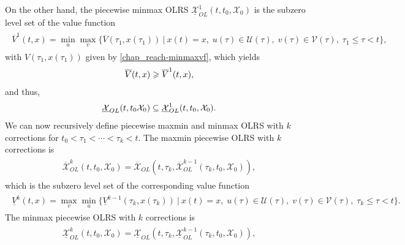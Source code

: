 \documentclass[letterpaper,10pt,english]{sphinxmanual}
\begin{document}
On the other hand, the piecewise minmax OLRS
\(\underline{{\mathcal X}}_{OL}^1(t, t_0, {\mathcal X}_0)\) is the
subzero level set of the value function
\label{chap_reach:equation-minmaxvf1}\begin{gather}
\begin{split}\overline{V}^1(t, x) =
\min_u\max_v\{\overline{V}(\tau_1, x(\tau_1)) ~|~ x(t)=x, \;
u(\tau)\in{\mathcal U}(\tau), \; v(\tau)\in{\mathcal V}(\tau), \; \tau_1\leqslant\tau<t\},\end{split}\label{chap_reach-minmaxvf1}
\end{gather}
with \(V(\tau_1, x(\tau_1))\) given by \eqref{chap_reach-minmaxvf}, which yields
\begin{gather}
\begin{split}\overline{V}(t, x) \geqslant\overline{V}^1(t, x),\end{split}\notag
\end{gather}
and thus,
\begin{gather}
\begin{split}\underline{{\mathcal X}}_{OL}(t, t_0 {\mathcal X}_0) \subseteq \underline{{\mathcal X}}_{OL}^1(t, t_0, {\mathcal X}_0) .\end{split}\notag
\end{gather}
We can now recursively define piecewise maxmin and minmax OLRS with
\(k\) corrections for \(t_0<\tau_1<\cdots<\tau_k<t\). The maxmin
piecewise OLRS with \(k\) corrections is
\label{chap_reach:equation-maxmink}\begin{gather}
\begin{split}\overline{{\mathcal X}}_{OL}^k(t, t_0, {\mathcal X}_0) =
\overline{{\mathcal X}}_{OL}(t, \tau_k, \overline{{\mathcal X}}_{OL}^{k-1}(\tau_k, t_0, {\mathcal X}_0)),\end{split}\label{chap_reach-maxmink}
\end{gather}
which is the subzero level set of the corresponding value function
\label{chap_reach:equation-maxminvfk}\begin{gather}
\begin{split}\underline{V}^k(t, x) = \max_v\min_u\{\underline{V}^{k-1}(\tau_k, x(\tau_k)) ~|~ x(t)=x, \;
u(\tau)\in{\mathcal U}(\tau), \; v(\tau)\in{\mathcal V}(\tau), \; \tau_k\leqslant\tau<t\}.\end{split}\label{chap_reach-maxminvfk}
\end{gather}
The minmax piecewise OLRS with \(k\) corrections is
\label{chap_reach:equation-minmaxk}\begin{gather}
\begin{split}\underline{{\mathcal X}}_{OL}^k(t, t_0, {\mathcal X}_0) =
\underline{{\mathcal X}}_{OL}(t, \tau_k, \underline{{\mathcal X}}_{OL}^{k-1}(\tau_k, t_0, {\mathcal X}_0)),\end{split}\label{chap_reach-minmaxk}
\end{gather}
\end{document}

